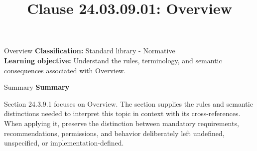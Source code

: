 \documentclass[10pt,letterpaper]{article}
\title{Clause 24.03.09.01: Overview}
\author{}
\date{}
\begin{document}
\maketitle
\begin{CornellOverviewBox}{Overview}
\textbf{Classification:} Standard library - Normative\\[2pt]
\textbf{Learning objective:} Understand the rules, terminology, and semantic consequences associated with Overview.
\end{CornellOverviewBox}\begin{CornellSummaryBox}{Summary}
{\sffamily\bfseries\color{Accent} Summary}\par\vspace{3pt}Section 24.3.9.1 focuses on Overview. The section supplies the rules and semantic distinctions needed to interpret this topic in context with its cross-references. When applying it, preserve the distinction between mandatory requirements, recommendations, permissions, and behavior deliberately left undefined, unspecified, or implementation-defined.
\end{CornellSummaryBox}
\end{document}
